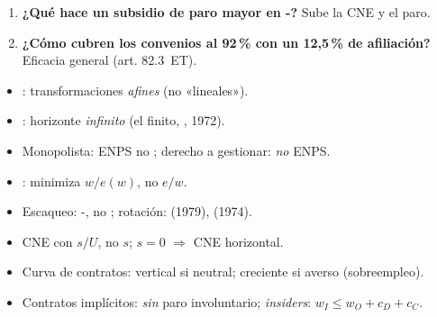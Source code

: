 \documentclass{article}
\begin{document}
\begin{columnas}
\begin{enumerate}
\item \textbf{¿Qué hace un subsidio de paro mayor en -?} Sube la CNE y el paro.
\item \textbf{¿Cómo cubren los convenios al 92\,\% con un 12,5\,\% de afiliación?} Eficacia general (art. 82.3~ET).
\end{enumerate}
\begin{trampa}
\begin{itemize}
\item {}: transformaciones \emph{afines} (no «lineales»).
\item {}: horizonte \emph{infinito} (el finito, , 1972).
\item Monopolista: ENPS no ; derecho a gestionar: \emph{no} ENPS.
\item {}: minimiza $w/e(w)$, no $e/w$.
\item Escaqueo: -, no ; rotación:  (1979),  (1974).
\item CNE con $s/U$, no $s$; $s=0$ $\Rightarrow$ CNE horizontal.
\item Curva de contratos: vertical si neutral; creciente si averso (sobreempleo).
\item Contratos implícitos: \emph{sin} paro involuntario; \emph{insiders}: $w_I\leq w_O+c_D+c_C$.
\end{itemize}
\end{trampa}

\end{columnas}
\end{document}
